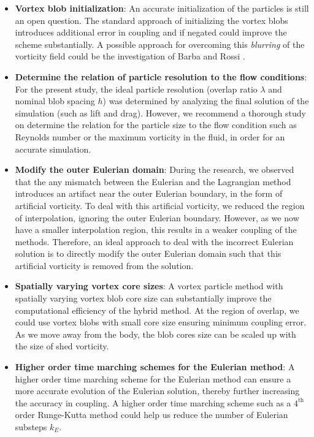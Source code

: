 \begin{itemize}

\item \textbf{Vortex blob initialization}: An accurate initialization of the particles is still an open question. The standard approach of initializing the vortex blobs introduces additional error in coupling and if negated could improve the scheme substantially. A possible approach for overcoming this \textit{blurring} of the vorticity field could be the investigation of Barba and Rossi \cite{Barba2010a}.

\item \textbf{Determine the relation of particle resolution to the flow conditions}: For the present study, the ideal particle resolution (overlap ratio $\lambda$ and nominal blob spacing $h$) was determined by analyzing the final solution of the simulation (such as lift and drag). However, we recommend a thorough study on determine the relation for the particle size to the flow condition such as Reynolds number or the maximum vorticity in the fluid, in order for an accurate simulation.

\item \textbf{Modify the outer Eulerian domain}: During the research, we observed that the any mismatch between the Eulerian and the Lagrangian method introduces an artifact near the outer Eulerian boundary, in the form of artificial vorticity. To deal with this artificial vorticity, we reduced the region of interpolation, ignoring the outer Eulerian boundary. However, as we now have a smaller interpolation region, this results in a weaker coupling of the methods. Therefore, an ideal approach to deal with the incorrect Eulerian solution is to directly modify the outer Eulerian domain such that this artificial vorticity is removed from the solution.

\item \textbf{Spatially varying vortex core sizes}: A vortex particle method with spatially varying vortex blob core size can substantially improve the computational efficiency of the hybrid method. At the region of overlap, we could use vortex blobs with small core size ensuring minimum coupling error. As we move away from the body, the blob cores size can be scaled up with the size of shed vorticity.

\item \textbf{Higher order time marching schemes for the Eulerian method}: A higher order time marching scheme for the Eulerian method can ensure a more accurate evolution of the Eulerian solution, thereby further increasing the accuracy in coupling. A higher order time marching scheme such as a $4^{\mathrm{th}}$ order Runge-Kutta method could help us reduce the number of Eulerian substeps $k_E$.


\end{itemize}

